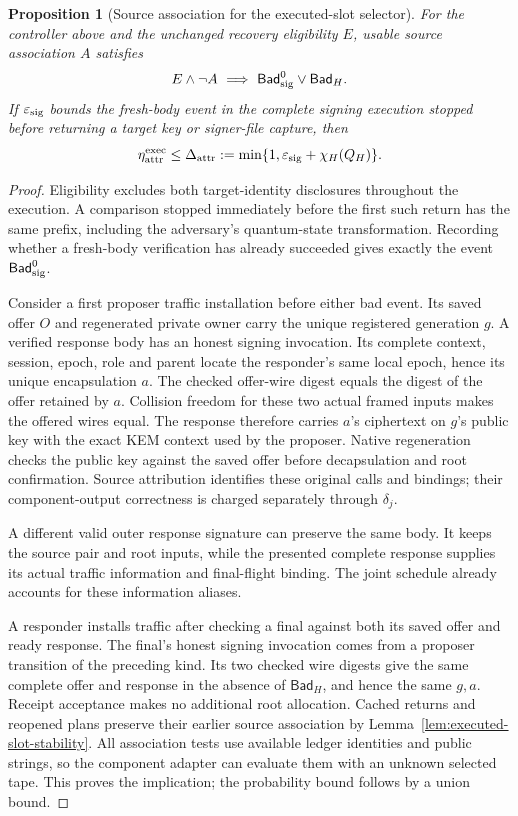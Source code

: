 \documentclass[pdflatex]{sn-jnl}
\theoremstyle{thmstyleone}
\newtheorem{proposition}[theorem]{Proposition}
\theoremstyle{thmstylethree}
\theoremstyle{thmstyletwo}
\begin{document}
\begin{proposition}[Source association for the executed-slot selector]
\label{prop:executed-source-attribution}
For the controller above and the unchanged recovery eligibility $E$,
usable source association $A$ satisfies
\[
 E\land\neg A\ \Longrightarrow\
       \mathsf{Bad}_{\rm sig}^{0}\lor\mathsf{Bad}_H.
\]
If $\varepsilon_{\rm sig}$ bounds the fresh-body event in the complete
signing execution stopped before returning a target key or signer-file
capture, then
\begin{equation}
 \eta_{\rm attr}^{\rm exec}
 \le\Delta_{\rm attr}
 :=\min\{1,\varepsilon_{\rm sig}+\chi_H(Q_H)\}.
 \label{eq:executed-attribution-cost}
\end{equation}
\end{proposition}
\begin{proof}
Eligibility excludes both target-identity disclosures throughout the
execution. A comparison stopped immediately before the first such
return has the same prefix, including the adversary's quantum-state
transformation. Recording whether a fresh-body verification has already
succeeded gives exactly the event $\mathsf{Bad}_{\rm sig}^{0}$.

Consider a first proposer traffic installation before either bad event.
Its saved offer $O$ and regenerated private owner carry the unique
registered generation $g$. A verified response body has an honest
signing invocation. Its complete context, session, epoch, role and parent
locate the responder's same local epoch, hence its unique encapsulation
$a$. The checked offer-wire digest equals the digest of the offer
retained by $a$. Collision freedom for these two actual framed inputs
makes the offered wires equal. The response therefore carries $a$'s
ciphertext on $g$'s public key with the exact KEM context used by the
proposer. Native regeneration checks the public key against the saved
offer before decapsulation and root confirmation. Source attribution
identifies these original calls and bindings; their component-output
correctness is charged separately through $\delta_j$.

A different valid outer response signature can preserve the same body.
It keeps the source pair and root inputs, while the presented complete
response supplies its actual traffic information and final-flight
binding. The joint schedule already accounts for these information aliases.

A responder installs traffic after checking a final against both its
saved offer and ready response. The final's honest signing invocation
comes from a proposer transition of the preceding kind. Its two checked
wire digests give the same complete offer and response in the absence
of $\mathsf{Bad}_H$, and hence the same $g,a$. Receipt acceptance makes
no additional root allocation. Cached returns and reopened plans preserve
their earlier source association by
Lemma~\ref{lem:executed-slot-stability}. All association tests use available
ledger identities and public strings, so the component adapter can
evaluate them with an unknown selected tape. This proves the implication;
the probability bound follows by a union bound.
\end{proof}
\end{document}
